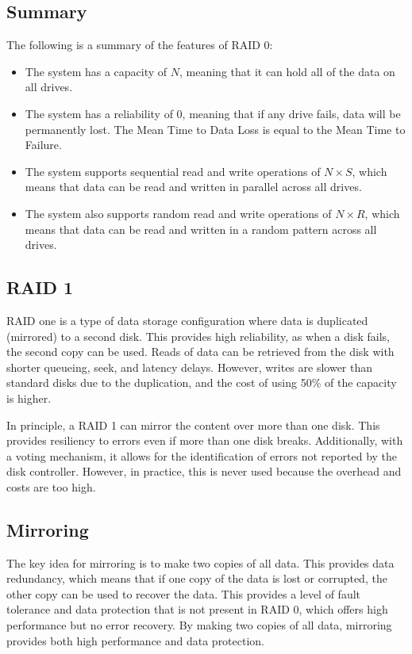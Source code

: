 \subsection{Summary}
The following is a summary of the features of RAID 0:
\begin{itemize}
\item The system has a capacity of $N$, meaning that it can hold all of the data on all drives.
\item The system has a reliability of $0$, meaning that if any drive fails, data will be permanently lost. 
    The Mean Time to Data Loss is equal to the Mean Time to Failure.
\item The system supports sequential read and write operations of $N\times S$, which means that data can be read and written in parallel across all drives.
\item The system also supports random read and write operations of $N\times R$, which means that data can be read and written in a random pattern across all drives.
\end{itemize}




\subsection{RAID 1}
RAID one is a type of data storage configuration where data is duplicated (mirrored) to a second disk. 
This provides high reliability, as when a disk fails, the second copy can be used. 
Reads of data can be retrieved from the disk with shorter queueing, seek, and latency delays.
However, writes are slower than standard disks due to the duplication, and the cost of using 50\% of the capacity is higher.

In principle, a RAID 1 can mirror the content over more than one disk. 
This provides resiliency to errors even if more than one disk breaks.
Additionally, with a voting mechanism, it allows for the identification of errors not reported by the disk controller. 
However, in practice, this is never used because the overhead and costs are too high.

\subsection{Mirroring}
The key idea for mirroring is to make two copies of all data. 
This provides data redundancy, which means that if one copy of the data is lost or corrupted, the other copy can be used to recover the data. 
This provides a level of fault tolerance and data protection that is not present in RAID 0, which offers high performance but no error recovery.
By making two copies of all data, mirroring provides both high performance and data protection.


